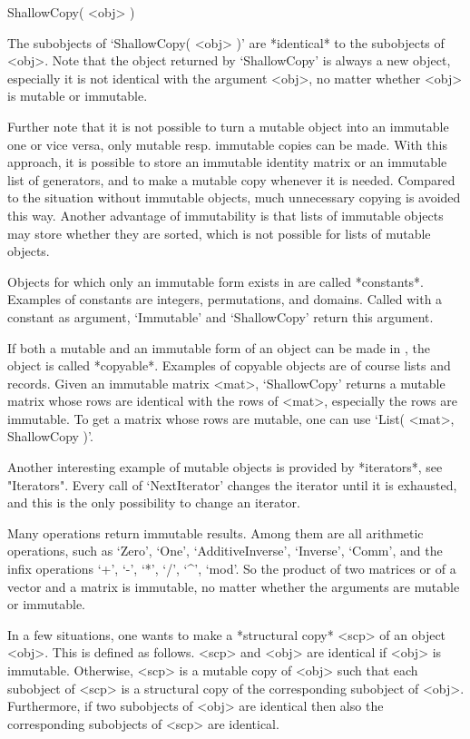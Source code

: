 \>ShallowCopy( <obj> )

The subobjects of `ShallowCopy( <obj> )' are *identical* to the
subobjects of <obj>.
Note that the object returned by `ShallowCopy' is always a new object,
especially it is not identical with the argument <obj>,
no matter whether <obj> is mutable or immutable.

Further note that it is not possible to turn a mutable object into an
immutable one or vice versa,
only mutable resp. immutable copies can be made.
With this approach,
it is possible to store an immutable identity matrix
or an immutable list of generators,
and to make a mutable copy whenever it is needed.
Compared to the situation without immutable objects,
much unnecessary copying is avoided this way.
Another advantage of immutability is
that lists of immutable objects may store whether they are sorted,
which is not possible for lists of mutable objects.

Objects for which only an immutable form exists in {\GAP}
are called *constants*.
Examples of constants are integers, permutations, and domains.
Called with a constant as argument,
`Immutable' and `ShallowCopy' return this argument.

If both a mutable and an immutable form of an object can be made in
{\GAP}, the object is called *copyable*.
Examples of copyable objects are of course lists and records.
Given an immutable matrix <mat>,
`ShallowCopy' returns a mutable matrix whose rows are identical with the
rows of <mat>,
especially the rows are immutable.
To get a matrix whose rows are mutable,
one can use `List( <mat>, ShallowCopy )'.

Another interesting example of mutable objects is provided by
*iterators*, see "Iterators".
Every call of `NextIterator' changes the iterator until it is exhausted,
and this is the only possibility to change an iterator.

Many operations return immutable results.
Among them are all arithmetic operations,
such as `Zero', `One', `AdditiveInverse', `Inverse', `Comm',
and the infix operations `+', `-', `*', `/', `^', `mod'.
So the product of two matrices or of a vector and a matrix is immutable,
no matter whether the arguments are mutable or immutable.

In a few situations,
one wants to make a *structural copy* <scp> of an object <obj>.
This is defined as follows.
<scp> and <obj> are identical if <obj> is immutable.
Otherwise, <scp> is a mutable copy of <obj> such that
each subobject of <scp> is a structural copy of the corresponding
subobject of <obj>.
Furthermore, if two subobjects of <obj> are identical then
also the corresponding subobjects of <scp> are identical. 

